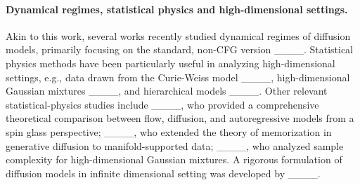 \paragraph{Dynamical regimes, statistical physics and high-dimensional settings.} Akin to this work, several works recently studied dynamical regimes of diffusion models, primarily focusing on the standard, non-CFG version ____. 
Statistical physics methods have been particularly useful in analyzing high-dimensional settings, e.g., data drawn from the Curie-Weiss model ____, high-dimensional Gaussian mixtures ____, and hierarchical models ____. 
Other relevant statistical-physics studies include ____, who provided a comprehensive theoretical comparison between flow, diffusion, and autoregressive models from a spin glass perspective; ____, who extended the theory of memorization in generative diffusion to manifold-supported data; ____, who analyzed sample complexity for 
high-dimensional Gaussian mixtures. A rigorous formulation of diffusion models in infinite dimensional setting was developed by ____.  
 
